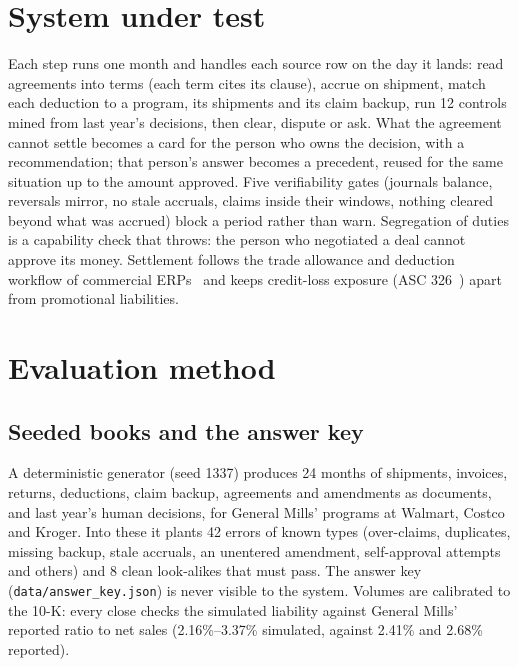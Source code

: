 \documentclass[10pt,letterpaper]{article}
\begin{document}
\section{System under test}
Each step runs one month and handles each source row on the day it lands: read agreements into terms
(each term cites its clause), accrue on shipment, match each deduction to a program, its shipments and
its claim backup, run 12 controls mined from last year's decisions, then clear, dispute or ask. What the
agreement cannot settle becomes a card for the person who owns the decision, with a recommendation; that
person's answer becomes a precedent, reused for the same situation up to the amount approved.
Five verifiability gates (journals balance, reversals mirror, no stale accruals, claims inside their
windows, nothing cleared beyond what was accrued) block a period rather than warn. Segregation of duties is
a capability check that throws: the person who negotiated a deal cannot approve its money. Settlement follows
the trade allowance and deduction workflow of commercial ERPs~\cite{msft} and keeps credit-loss exposure
(ASC 326~\cite{asc326}) apart from promotional liabilities.

\section{Evaluation method}
\subsection{Seeded books and the answer key}
A deterministic generator (seed 1337) produces 24 months of shipments, invoices, returns, deductions,
claim backup, agreements and amendments as documents, and last year's human decisions, for General Mills'
programs at Walmart, Costco and Kroger. Into these it plants 42 errors of known types (over-claims,
duplicates, missing backup, stale accruals, an unentered amendment, self-approval attempts and others) and
8 clean look-alikes that must pass. The answer key (\texttt{data/answer\_key.json}) is never visible to
the system. Volumes are calibrated to the 10-K: every close checks the simulated liability against
General Mills' reported ratio to net sales (2.16\%--3.37\% simulated, against 2.41\% and 2.68\% reported).
\end{document}
